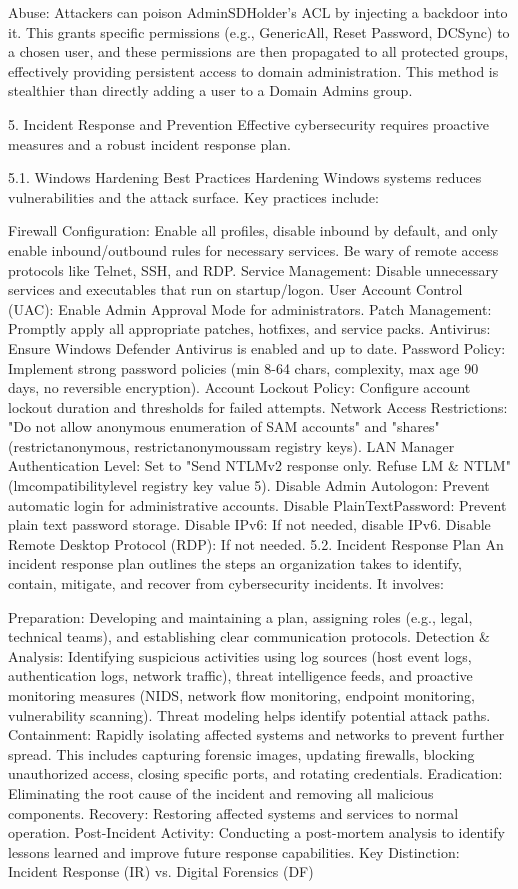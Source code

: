 Abuse: Attackers can poison AdminSDHolder's ACL by injecting a backdoor into it. This grants specific permissions (e.g., GenericAll, Reset Password, DCSync) to a chosen user, and these permissions are then propagated to all protected groups, effectively providing persistent access to domain administration. This method is stealthier than directly adding a user to a Domain Admins group.

5. Incident Response and Prevention
Effective cybersecurity requires proactive measures and a robust incident response plan.

5.1. Windows Hardening Best Practices
Hardening Windows systems reduces vulnerabilities and the attack surface. Key practices include:

Firewall Configuration: Enable all profiles, disable inbound by default, and only enable inbound/outbound rules for necessary services. Be wary of remote access protocols like Telnet, SSH, and RDP.
Service Management: Disable unnecessary services and executables that run on startup/logon.
User Account Control (UAC): Enable Admin Approval Mode for administrators.
Patch Management: Promptly apply all appropriate patches, hotfixes, and service packs.
Antivirus: Ensure Windows Defender Antivirus is enabled and up to date.
Password Policy: Implement strong password policies (min 8-64 chars, complexity, max age 90 days, no reversible encryption).
Account Lockout Policy: Configure account lockout duration and thresholds for failed attempts.
Network Access Restrictions: "Do not allow anonymous enumeration of SAM accounts" and "shares" (restrictanonymous, restrictanonymoussam registry keys).
LAN Manager Authentication Level: Set to "Send NTLMv2 response only. Refuse LM \& NTLM" (lmcompatibilitylevel registry key value 5).
Disable Admin Autologon: Prevent automatic login for administrative accounts.
Disable PlainTextPassword: Prevent plain text password storage.
Disable IPv6: If not needed, disable IPv6.
Disable Remote Desktop Protocol (RDP): If not needed.
5.2. Incident Response Plan
An incident response plan outlines the steps an organization takes to identify, contain, mitigate, and recover from cybersecurity incidents. It involves:

Preparation: Developing and maintaining a plan, assigning roles (e.g., legal, technical teams), and establishing clear communication protocols.
Detection \& Analysis: Identifying suspicious activities using log sources (host event logs, authentication logs, network traffic), threat intelligence feeds, and proactive monitoring measures (NIDS, network flow monitoring, endpoint monitoring, vulnerability scanning). Threat modeling helps identify potential attack paths.
Containment: Rapidly isolating affected systems and networks to prevent further spread. This includes capturing forensic images, updating firewalls, blocking unauthorized access, closing specific ports, and rotating credentials.
Eradication: Eliminating the root cause of the incident and removing all malicious components.
Recovery: Restoring affected systems and services to normal operation.
Post-Incident Activity: Conducting a post-mortem analysis to identify lessons learned and improve future response capabilities.
Key Distinction: Incident Response (IR) vs. Digital Forensics (DF)

